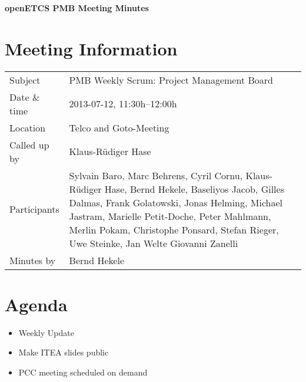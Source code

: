 \documentclass[a4paper, 11pt]{article}
\begin{document}
{\begin{center}\huge\bf openETCS PMB Meeting Minutes\end{center}}
\section{Meeting Information}

\renewcommand{\arraystretch}{1.5}
\begin{supertabular}{m{.2\textwidth}m{.8\textwidth}}
Subject & PMB Weekly Scrum: Project Management Board\\
Date \& time & 2013-07-12, 11:30h--12:00h\\
Location & Telco and Goto-Meeting\\
Called up by & Klaus-R\"udiger Hase\\
Participants &
Sylvain Baro,
Marc Behrens,
Cyril Cornu,
Klaus-R\"udiger Hase,
Bernd Hekele,
Baseliyos Jacob,
Gilles Dalmas,
Frank Golatowski,
Jonas Helming,
Michael Jastram,
Marielle Petit-Doche,
Peter Mahlmann,
Merlin Pokam,
Christophe Ponsard,
Stefan Rieger,
Uwe Steinke,
Jan Welte
Giovanni Zanelli
\\

Minutes by & Bernd Hekele\\

\end{supertabular}
\renewcommand{\arraystretch}{1.0}


\section{{Agenda}}
\begin{itemize}
\item Weekly Update\\
\item Make ITEA slides public\\
\item PCC meeting scheduled on demand\\
\end{itemize}
\end{document}
